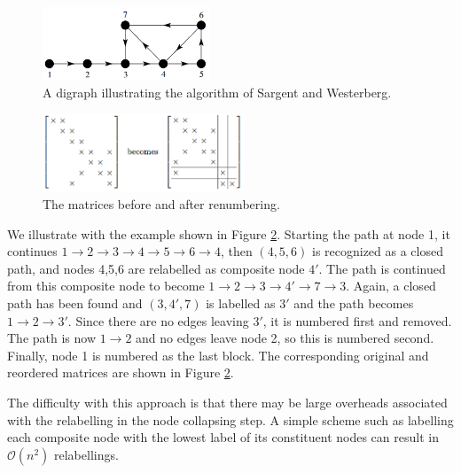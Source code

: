 \begin{exm}
   \begin{figure}[H]
    \centering
    \includegraphics[width=5cm]{png/DigraphToBTri.png}
    \caption{A digraph illustrating the algorithm of Sargent and
      Westerberg.}
    \label{fig:DigraphToBTri}
  \end{figure}
   \begin{figure}[H]
     \centering
    \includegraphics[width=6cm]{png/SequenceOfAlgoSW2.png}
    \caption{The matrices before and after renumbering.}
    \label{fig:MatricesChange}
  \end{figure}
  We illustrate with the example shown in Figure
  \ref{fig:MatricesChange}. Starting the path at node 1, it continues
  $1 \rightarrow 2\rightarrow 3\rightarrow 4\rightarrow 5\rightarrow
  6\rightarrow 4$, then $(4,5,6)$ is recognized as a closed path, and
  nodes 4,5,6 are relabelled as composite node $4'$. The path is
  continued from this composite node to become $1\rightarrow
  2\rightarrow 3\rightarrow 4'\rightarrow 7\rightarrow 3$. Again, a
  closed path has been found and $(3,4',7)$ is labelled as $3'$ and
  the path becomes $1\rightarrow 2\rightarrow 3'.$ Since there are no
  edges leaving $3'$, it is numbered first and removed. The path is
  now $1\rightarrow 2$ and no edges leave node 2, so this is numbered
  second. Finally, node 1 is numbered as the last block. The
  corresponding original and reordered matrices are shown in Figure
  \ref{fig:MatricesChange}.
\end{exm}

\begin{rmk}
  The difficulty with this approach is that there may be large
  overheads associated with the relabelling in the node collapsing
  step. A simple scheme such as labelling each composite node with the
  lowest label of its constituent nodes can result in $\mathcal{O}(n^2)$ relabellings.
\end{rmk}

